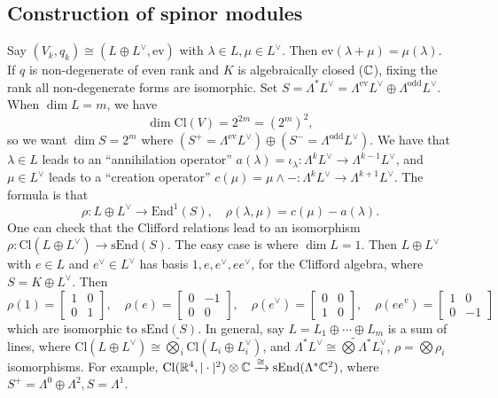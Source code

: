 \subsection{Construction of spinor modules}
Say $(V_k, q_k) \cong  (L \oplus L ^{\vee}, \mathrm{ev})$ with $\lambda\in L, \mu \in  L ^{\vee}$. Then $\mathrm{ev}(\lambda + \mu) = \mu(\lambda)$. If $q$ is non-degenerate of even rank and $K$ is algebraically closed ($\mathbb{C}$), fixing the rank all non-degenerate forms are isomorphic. Set $S = \Lambda ^* L ^{\vee}= \Lambda ^{\mathrm{ev}}L ^{\vee}\oplus \Lambda ^{\mathrm{odd}}L ^{\vee}$. When $\dim L = m$, we have \[
    \dim \mathrm{Cl}(V) = 2^{2m}= (2^m)^2,
\] so we want $\dim S = 2^m$ where $(S^+ = \Lambda ^{\mathrm{ev}}L ^{\vee})\oplus (S^- = \Lambda ^{\mathrm{odd}}L ^{\vee})$. We have that $\lambda \in  L$ leads to an ``annihilation operator'' $a(\lambda) = \iota_{\lambda} \colon \Lambda^k L ^{\vee} \to \Lambda^{k-1}L ^{\vee}$, and $\mu \in L ^{\vee}$ leads to a ``creation operator'' $c(\mu) = \mu \wedge - \colon \Lambda^k L ^{\vee} \to \Lambda^{k+1}L ^{\vee}$. The formula is that \[
\rho \colon L \oplus L ^{\vee} \to \mathrm{End}^1(S), \quad \rho (\lambda, \mu) = c(\mu) - a(\lambda).
\] One can check that the Clifford relations lead to an isomorphism $\rho \colon \mathrm{Cl}(L\oplus L^{\vee}) \to \mathrm{sEnd}(S)$. The easy case is where $\dim L = 1$. Then $L \oplus L ^{\vee}$ with $e \in L$ and $e^{\vee}\in  L ^{\vee}$ has basis $1, e, e ^{\vee}, ee ^{\vee} $, for the Clifford algebra, where $S = K \oplus L ^{\vee}$. Then \[
\rho(1)=
\begin{bmatrix}
    1 & 0 \\ 0 & 1
\end{bmatrix},\quad \rho(e) = 
\begin{bmatrix}
    0 & -1 \\ 0 & 0
\end{bmatrix},\quad \rho(e^{\vee})=
\begin{bmatrix}
    0 & 0 \\ 1 & 0 
\end{bmatrix},\quad \rho(ee ^v) = 
\begin{bmatrix}
    1 & 0 \\ 0 & -1
\end{bmatrix} 
\] which are isomorphic to  $\mathrm{sEnd}(S)$. In general, say $L = L_1\oplus \cdots \oplus L_m$ is a sum of lines, where $\mathrm{Cl}(L \oplus L ^{\vee}) \cong \widetilde{\bigotimes} _i \mathrm{Cl}(L_i \oplus L_i  ^{\vee})$, and $\Lambda^* L ^{\vee}\cong  \widetilde{\bigotimes} \Lambda^* L_i  ^{\vee} $, $\rho = \bigotimes \rho_i $ isomorphisms. For example, $\mathrm{Cl}(\mathbb{R}^4, |\cdot |^2)\otimes \mathbb{C} \xrightarrow{\cong } \mathrm{sEnd}(\Lambda^* \mathbb{C}^2)$, where $S^+ = \Lambda^0\oplus \Lambda^2, S = \Lambda^1$.

